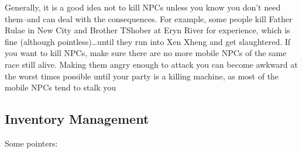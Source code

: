 \documentclass[12pt]{article}
\begin{document}
Generally, it is a good idea not to kill NPCs unless you know you don't
need them--and can deal with the consequences. For example, some people
kill Father Rulae in New City and Brother TShober at Eryn River for
experience, which is fine (although pointless)\ldots{}until they run
into Xen Xheng and get slaughtered. If you want to kill NPCs, make sure
there are no more mobile NPCs of the same race still alive. Making them
angry enough to attack you can become awkward at the worst times
possible until your party is a killing machine, as most of the mobile
NPCs tend to stalk you

\subsection{Inventory Management}\label{inventory-management}

Some pointers:
\end{document}
